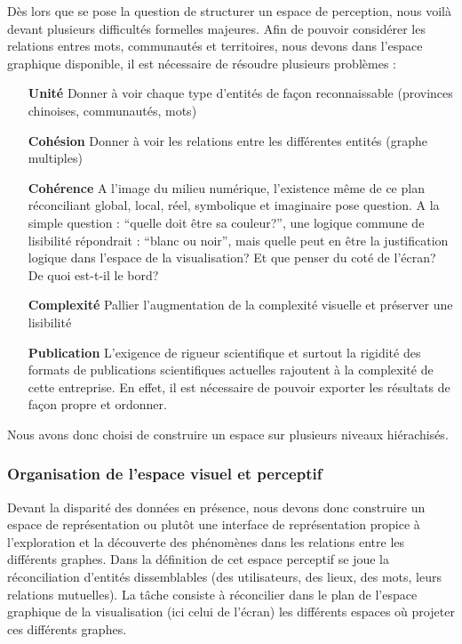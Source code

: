 Dès lors que se pose la question de structurer un espace de perception, nous voilà devant plusieurs difficultés formelles majeures. Afin de pouvoir considérer les relations entres mots, communautés et
territoires, nous devons dans l{\textquoteright}espace graphique
disponible, il est nécessaire de résoudre plusieurs problèmes :

\begin{itemize}
    \item[\textbf{Unité}] 
    Donner à voir chaque type d{\textquoteright}entités de fa\c{c}on reconnaissable (provinces chinoises, communautés, mots)

    \item[\textbf{Cohésion}] 
    Donner à voir les relations entre les différentes entités (graphe multiples)

    \item[\textbf{Cohérence}]
    A l{\textquoteright}image du milieu numérique, l{\textquoteright}existence même de ce plan réconciliant global, local, réel, symbolique et imaginaire pose question. A la simple question : {\textquotedblleft}quelle doit être sa couleur?{\textquotedblright}, une logique commune de lisibilité répondrait : {\textquotedblleft}blanc ou noir{\textquotedblright}, mais quelle peut en être la justification logique dans l{\textquoteright}espace de la visualisation? Et que penser du coté de l{\textquoteright}écran? De quoi est-t-il le bord?

    \item[\textbf{Complexité}] 
    Pallier l{\textquoteright}augmentation de la complexité visuelle et préserver une lisibilité

    \item[\textbf{Publication}]
    L{\textquoteright}exigence de rigueur scientifique et surtout la rigidité des formats de publications scientifiques actuelles rajoutent à la complexité de cette entreprise. En effet, il est nécessaire de pouvoir exporter les résultats de façon propre et ordonner.

\end{itemize} 

Nous avons donc choisi de construire un espace sur plusieurs niveaux hiérachisés.

\subsubsection{Organisation de l'espace visuel et perceptif}

    Devant la disparité des données en présence, nous devons donc construire un espace de représentation ou plut\^ot une interface de représentation propice à l{\textquoteright}exploration et la découverte des phénomènes dans les relations entre les différents graphes. Dans la définition de cet espace perceptif se joue la réconciliation d{\textquoteright}entités dissemblables (des utilisateurs, des lieux, des mots, leurs relations mutuelles). La t\^ache consiste à réconcilier dans le plan de l{\textquoteright}espace graphique de la visualisation (ici celui de l{\textquoteright}écran) les différents espaces o\`u projeter ces différents graphes. 

